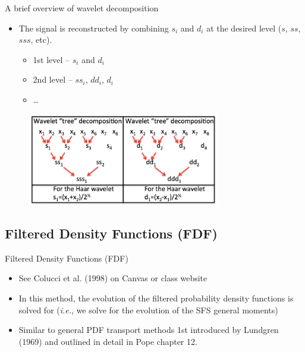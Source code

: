 
\begin{frame}{A brief overview of wavelet decomposition}


\begin{itemize}
	\item The signal is reconstructed by combining $s_i$ and $d_i$ at the desired level ($s$, $ss$, $sss$, etc).
	\begin{itemize}
		\item 1st level – $s_i$ and $d_i$
		\item 2nd level – $ss_i$, $dd_i$, $d_i$
		\item \dots 
	\end{itemize} 
\end{itemize}
\begin{figure}
	\includegraphics[width=0.75\textwidth]{wavelet4}
\end{figure}

\end{frame}

\subsection{Filtered Density Functions (FDF)}

\begin{frame}{Filtered Density Functions (FDF)}

\begin{itemize}
	\item See Colucci et al. (1998) on Canvas or class website
	\item In this method, the evolution of the filtered probability density functions is solved for (\textit{i.e.}, we solve for the evolution of the SFS general moments)
	\item Similar to general PDF transport methods 1st introduced by Lundgren (1969) and outlined in detail in Pope chapter 12.
\end{itemize}

\end{frame}

